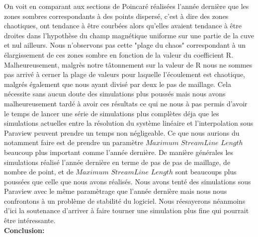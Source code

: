 \documentclass[a4paper,12pt,titlepage]{report}
\begin{document}
\begin{onehalfspace}
On voit en comparant aux sections de Poincaré réalisées l'année dernière que les zones sombres correspondants à des points dispersé, c'est à dire des zones chaotiques, ont tendance à être courbées alors qu'elles avaient tendance à être droites dans l'hypothèse du champ magnétique uniforme sur une partie de la cuve et nul ailleurs.
Nous n'observons pas cette "plage du chaos" correspondant à un élargissement de ces zones sombre en fonction de la valeur du coefficient R.
Malheureusement, malgrès notre tâtonnement sur la valeur de R nous ne sommes pas arrivé à cerner la plage de valeurs pour laquelle l'écoulement est chaotique, malgrés également que nous ayant divisé par deux le pas de maillage. Cela nécessite sans aucun doute des simulations plus poussés mais nous avons malheureusement tardé à avoir ces résultats ce qui ne nous à pas permis d'avoir le temps de lancer une série de simulations plus complètes déja que les simulations actuelles entre la résolution du système linéaire et l'interpolation sous Paraview peuvent prendre un temps non négligeable. Ce que nous aurions du notamment faire est de prendre un paramètre $Maximum$ $StreamLine$ $Length$ beaucoup plus important comme l'année dernière. De manière générales les simulations réalisé l'année dernière en terme de pas de pas de maillage, de nombre de point, et de $Maximum$ $StreamLine$ $Length$ sont beaucoups plus poussées que celle que nous avons réalisés. Nous avons tenté des simulations sous Paraview avec le même paramètrage que l'année dernière mais nous nous confrontons à un problème de stabilité du logiciel.
Nous réesayerons néanmoins d'ici la soutenance d'arriver à faire tourner une simulation plus fine qui pourrait être intéressante.\\
\newpage
\newpage
\textbf{\Huge Conclusion:}
\normalsize
\\


\end{onehalfspace}
\end{document}
